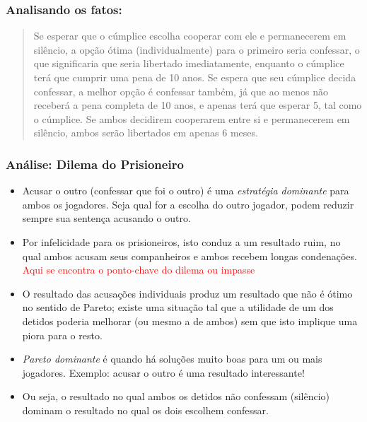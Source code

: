 
\begin{frame}
    \frametitle{Analisando os fatos:}

\begin{quotation}
Se  esperar que o cúmplice escolha cooperar com ele e permanecerem em silêncio, a opção ótima (individualmente) para o primeiro seria confessar, o que significaria que seria libertado imediatamente, enquanto o cúmplice terá que cumprir uma pena de 10 anos. Se espera que seu cúmplice decida confessar, a melhor opção é confessar também, já que ao menos não receberá a pena completa de 10 anos, e apenas terá que esperar 5, tal como o cúmplice. Se ambos decidirem cooperarem entre si e permanecerem em silêncio, ambos serão libertados em apenas 6 meses.
\end{quotation}


\end{frame}


\begin{frame}
    \frametitle{Análise: Dilema do Prisioneiro}

   \begin{itemize}
     \item Acusar o outro (confessar que foi o outro)  é uma \textit{estratégia dominante} para ambos os jogadores. Seja qual for a escolha do outro jogador, podem reduzir sempre sua sentença acusando o outro. 
   
  \item Por infelicidade para os prisioneiros, isto conduz a um resultado ruim, no qual ambos acusam seus companheiros e ambos recebem longas condenações. \textcolor{red}{Aqui se encontra o ponto-chave do dilema ou impasse} 
  
  \item O resultado das acusações individuais produz um resultado que não é ótimo no sentido de Pareto; existe uma situação tal que a utilidade de um dos detidos poderia melhorar (ou mesmo a de ambos) sem que isto implique uma piora para o resto. 
  
  \item \textit{Pareto dominante} é quando há soluções muito boas para um ou mais jogadores. Exemplo: acusar o outro é uma resultado interessante!
  
  \item Ou seja, o resultado no qual ambos os detidos não confessam (silêncio) dominam o resultado no qual os dois escolhem confessar.


   \end{itemize}
   
\end{frame}


